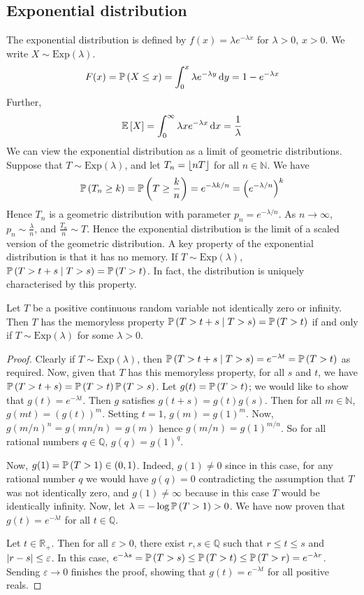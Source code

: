 \subsection{Exponential distribution}
The exponential distribution is defined by \(f(x) = \lambda e^{-\lambda x}\) for \(\lambda > 0\), \(x > 0\).
We write \(X \sim \mathrm{Exp}(\lambda)\).
\[
	F(x) = \mathbb{P}\left({X \leq x}\right) = \int_0^x \lambda e^{-\lambda y} \dd{y} = 1 - e^{-\lambda x}
\]
Further,
\[
	\mathbb{E}\left[{X}\right] = \int_0^\infty \lambda x e^{-\lambda x} \dd{x} = \frac{1}{\lambda}
\]
We can view the exponential distribution as a limit of geometric distributions.
Suppose that \(T \sim \mathrm{Exp}(\lambda)\), and let \(T_n = \lfloor nT\rfloor\) for all \(n \in \mathbb N\).
We have
\[
	\mathbb{P}\left({T_n \geq k}\right) = \mathbb{P}\left({T \geq \frac{k}{n}}\right) = e^{-\lambda k / n} = \left( e^{-\lambda/n} \right)^k
\]
Hence \(T_n\) is a geometric distribution with parameter \(p_n = e^{-\lambda/n}\).
As \(n \to \infty\), \(p_n \sim \frac{\lambda}{n}\), and \(\frac{T_n}{n} \sim T\).
Hence the exponential distribution is the limit of a scaled version of the geometric distribution.
A key property of the exponential distribution is that it has no memory.
If \(T \sim \mathrm{Exp}(\lambda)\), \(\mathbb{P}\left({T > t + s \mid T > s}\right) = \mathbb{P}\left({T > t}\right)\).
In fact, the distribution is uniquely characterised by this property.
\begin{proposition}
	Let \(T\) be a positive continuous random variable not identically zero or infinity.
	Then \(T\) has the memoryless property \(\mathbb{P}\left({T > t + s \mid T > s}\right) = \mathbb{P}\left({T > t}\right)\) if and only if \(T \sim \mathrm{Exp}(\lambda)\) for some \(\lambda > 0\).
\end{proposition}
\begin{proof}
	Clearly if \(T \sim \mathrm{Exp}(\lambda)\), then \(\mathbb{P}\left({T > t + s \mid T > s}\right) = e^{-\lambda t} = \mathbb{P}\left({T > t}\right)\) as required.
	Now, given that \(T\) has this memoryless property, for all \(s\) and \(t\), we have \(\mathbb{P}\left({T > t + s}\right) = \mathbb{P}\left({T > t}\right) \mathbb{P}\left({T > s}\right)\).
	Let \(g(t) = \mathbb{P}\left({T > t}\right)\); we would like to show that \(g(t) = e^{-\lambda t}\).
	Then \(g\) satisfies \(g(t+s) = g(t)g(s)\).
	Then for all \(m \in \mathbb N\), \(g(mt) = (g(t))^m\).
	Setting \(t=1\), \(g(m) = g(1)^m\).
	Now, \(g(m/n)^n = g(mn/n) = g(m)\) hence \(g(m/n) = g(1)^{m/n}\).
	So for all rational numbers \(q \in \mathbb Q\), \(g(q) = g(1)^q\).

	Now, \(g(1) = \mathbb{P}\left({T > 1}\right) \in (0, 1)\).
	Indeed, \(g(1) \neq 0\) since in this case, for any rational number \(q\) we would have \(g(q) = 0\) contradicting the assumption that \(T\) was not identically zero, and \(g(1) \neq \infty\) because in this case \(T\) would be identically infinity.
	Now, let \(\lambda = -\log\mathbb{P}\left({T > 1}\right) > 0\).
	We have now proven that \(g(t) = e^{-\lambda t}\) for all \(t\in\mathbb Q\).

	Let \(t \in \mathbb R_+\).
	Then for all \(\varepsilon > 0\), there exist \(r, s \in \mathbb Q\) such that \(r \leq t \leq s\) and \(\abs{r - s} \leq \varepsilon\).
	In this case, \(e^{-\lambda s} = \mathbb{P}\left({T > s}\right) \leq \mathbb{P}\left({T > t}\right) \leq \mathbb{P}\left({T > r}\right) = e^{-\lambda r}\).
	Sending \(\varepsilon \to 0\) finishes the proof, showing that \(g(t) = e^{-\lambda t}\) for all positive reals.
\end{proof}

